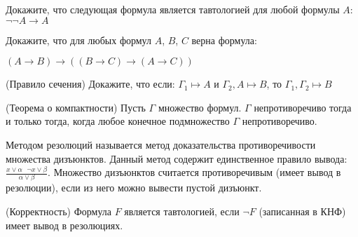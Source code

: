 \setcounter{curtask}{1}

\begin{task}
    Докажите, что следующая формула является тавтологией для любой
    формулы $A$: $\neg\neg A \rightarrow A$
\end{task}

\begin{task}
    Докажите, что для любых формул $A$, $B$, $C$ верна формула:
    \begin{center}
        $(A \rightarrow B) \rightarrow ((B \rightarrow C) \rightarrow (A
	    \rightarrow C))$
    \end{center}
\end{task}

\begin{task} (Правило сечения)
    Докажите, что если: $\Gamma_1 \mapsto A$ и $\Gamma_2, A \mapsto
    B$, то $\Gamma_1, \Gamma_2 \mapsto B$
\end{task}

\begin{task} (Теорема о компактности)
    Пусть $\Gamma$ множество формул. $\Gamma$ непротиворечиво тогда и
    только тогда, когда любое конечное подмножество $\Gamma$ непротиворечиво.
\end{task}

\vspace{0.5cm}
Методом резолюций называется метод доказательства противоречивости
множества дизъюнктов. Данный метод содержит единственное правило
вывода: $\frac{x \vee \alpha \ \ \ \neg x \vee \beta}{\alpha \vee
  \beta}$. Множество дизъюнктов считается противоречивым (имеет вывод
в резолюции), если из него можно вывести пустой дизъюнкт.

\begin{task} (Корректность)
    Формула $F$ является тавтологией, если $\neg F$ (записанная в КНФ)
    имеет вывод в резолюциях.
\end{task}